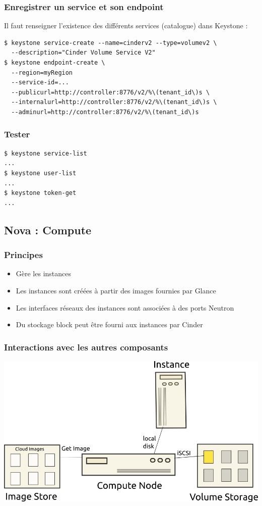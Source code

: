   \begin{frame}[containsverbatim]
    \frametitle{Enregistrer un service et son endpoint}
    Il faut renseigner l'existence des différents services (catalogue) dans Keystone :
    \begin{verbatim}
$ keystone service-create --name=cinderv2 --type=volumev2 \
  --description="Cinder Volume Service V2"
$ keystone endpoint-create \
  --region=myRegion
  --service-id=...
  --publicurl=http://controller:8776/v2/%\(tenant_id\)s \
  --internalurl=http://controller:8776/v2/%\(tenant_id\)s \
  --adminurl=http://controller:8776/v2/%\(tenant_id\)s
    \end{verbatim}
  \end{frame}

  \begin{frame}[containsverbatim]
    \frametitle{Tester}
\begin{verbatim}
$ keystone service-list
...
$ keystone user-list
...
$ keystone token-get
...
\end{verbatim}
  \end{frame}

  \subsection[Nova]{Nova : Compute}

  \begin{frame}
    \frametitle{Principes}
    \begin{itemize}
      \item Gère les instances
      \item Les instances sont créées à partir des images fournies par Glance
      \item Les interfaces réseaux des instances sont associées à des ports Neutron
      \item Du stockage block peut être fourni aux instances par Cinder
    \end{itemize}
  \end{frame}

  \begin{frame}
    \frametitle{Interactions avec les autres composants}
    \includegraphics[width=\textwidth]{images/compute-node.png}
  \end{frame}

